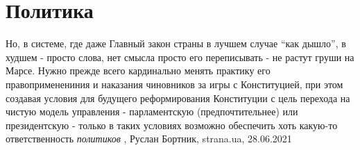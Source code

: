  
 
 
 
 
\chapter{Политика}

Но, в системе, где даже Главный закон страны в лучшем случае \enquote{как дышло}, в
худшем - просто слова, нет смысла просто его переписывать - не растут груши на
Марсе. Нужно прежде всего кардинально менять практику его правоприменениния и
наказания чиновников за игры с Конституцией, при этом создавая условия для
будущего реформирования Конституции с цель перехода на чистую модель управления
- парламентскую (предпочтительнее) или президентскую - только в таких условиях
возможно обеспечить хоть какую-то ответственность \emph{политиков}
, 
Руслан Бортник, strana.ua, 28.06.2021
